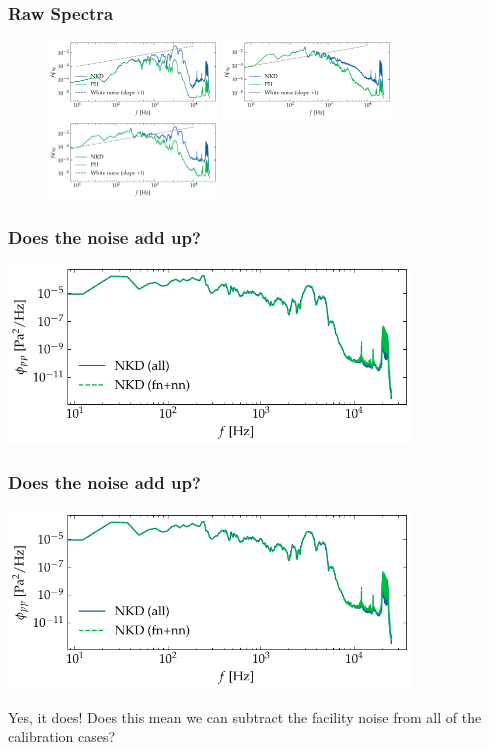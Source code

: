 \documentclass[aspectratio=169,9pt]{beamer}
\begin{document}
\begin{frame}
  \frametitle{Raw Spectra}
  \begin{figure}
    \centering
    \includegraphics[width=0.4\textwidth]{sanity/50psi/PH-NKD/calib_spectra_50psi_nonoise.pdf}
    \includegraphics[width=0.4\textwidth]{sanity/50psi/PH-NKD/calib_spectra_50psi_noise.pdf}
    \includegraphics[width=0.4\textwidth]{sanity/50psi/PH-NKD/calib_spectra_50psi_noiseWN.pdf}
  \end{figure}
\end{frame}

\begin{frame}
  \frametitle{Does the noise add up?}
    \centering
    \includegraphics[width=0.8\textwidth]{sanity/50psi/PH-NKD/calib_spectra_50psi_nkd_fn_plus_nn.pdf}
\end{frame}

\begin{frame}
  \frametitle{Does the noise add up?}
  \centering
  \includegraphics[width=0.8\textwidth]{sanity/50psi/PH-NKD/calib_spectra_50psi_nkd_fn_plus_nn.pdf}

    Yes, it does! Does this mean we can subtract the facility noise from all of the calibration cases?
\end{frame}
\end{document}
